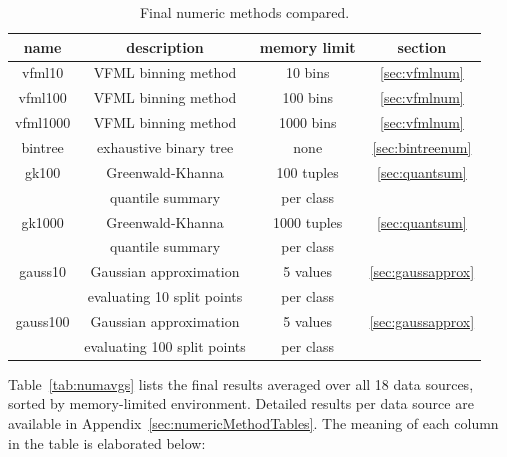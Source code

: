 \begin{table}
\caption{Final numeric methods compared.}
\label{tab:finalnummethods}
\centering
\begin{tabular}{|c|c|c|c|}
\hline
name & description & memory limit & section \\
\hline
\hline
{\sc vfml10} & VFML binning method & 10 bins & \ref{sec:vfmlnum} \\
\hline
{\sc vfml100} & VFML binning method & 100 bins & \ref{sec:vfmlnum} \\
\hline
{\sc vfml1000} & VFML binning method & 1000 bins & \ref{sec:vfmlnum} \\
\hline
{\sc bintree} & exhaustive binary tree & none & \ref{sec:bintreenum} \\
\hline
{\sc gk100} & Greenwald-Khanna & 100 tuples & \ref{sec:quantsum} \\
 & quantile summary & per class &  \\
 \hline
 {\sc gk1000} & Greenwald-Khanna & 1000 tuples & \ref{sec:quantsum} \\
 & quantile summary & per class &  \\
 \hline
{\sc gauss10} & Gaussian approximation & 5 values & \ref{sec:gaussapprox} \\
 & evaluating 10 split points & per class &  \\
 \hline
 {\sc gauss100} & Gaussian approximation & 5 values & \ref{sec:gaussapprox} \\
 & evaluating 100 split points & per class &  \\
\hline
\end{tabular}
\end{table}

Table~\ref{tab:numavgs} lists the final results averaged over all 18 data sources, sorted by memory-limited environment. Detailed results per data source are available in Appendix~\ref{sec:numericMethodTables}. 
The meaning of each column in the table is elaborated below:

